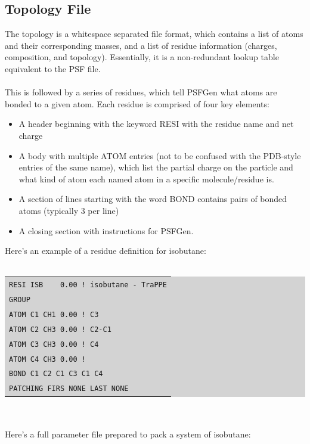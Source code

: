 \subsection{Topology File}
The topology is a whitespace separated file format, which contains a list of atoms and  their corresponding masses, and a list of residue information (charges, composition, and topology). Essentially, it is a non-redundant lookup table equivalent to the PSF file.\\\\
This is followed by a series of residues, which tell PSFGen what atoms are bonded to a given atom. Each residue is comprised of four key elements:
\begin{itemize}
\item A header beginning with the keyword RESI with the residue name and net charge
\item A body with multiple ATOM entries (not to be confused with the PDB-style entries of the same name), which list the partial charge on the particle and what kind of atom each named atom in a specific molecule/residue is.
\item A section of lines starting with the word BOND contains pairs of bonded atoms (typically 3 per line)
\item A closing section with instructions for PSFGen.
\end{itemize}
Here's an example of a residue definition for isobutane:\\\\
\colorbox{lightgray}{
\begin{tabular}{l}
\texttt{RESI ISB ~~ 0.00 ! isobutane - TraPPE}\\
\texttt{GROUP}\\
\texttt{ATOM C1 CH1    0.00 !    C3}\\
\texttt{ATOM C2 CH3    0.00 ! C2-C1}\\
\texttt{ATOM C3 CH3    0.00 !    C4}\\
\texttt{ATOM C4 CH3    0.00 !}\\
\texttt{BOND C1 C2 C1 C3 C1 C4}\\
\texttt{PATCHING FIRS NONE LAST NONE}
\end{tabular}}\\\\
Here's a full parameter file prepared to pack a system of isobutane:\\\\
